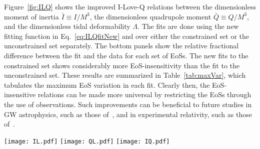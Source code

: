 \documentclass[prd,twocolumn,nofootinbib,superscriptaddress,amsmath,amssymb]{revtex4-1}
\begin{document}
Figure~\ref{fig:ILQ} shows the improved I-Love-Q relations between the dimensionless moment of inertia $\bar{I} \equiv I/M^3$, the dimensionless quadrupole moment $\bar{Q} \equiv Q/M^3$, and the dimensionless tidal deformability $\Lambda$. The fits are done using the new fitting function in Eq.~\eqref{eq:ILQfitNew} and over either the constrained set or the unconstrained set separately. The bottom panels show the relative fractional difference between the fit and the data for each set of EoSs. The new fits to the constrained set shows considerably more EoS-insensitivity than the fit to the unconstrained set. These results are summarized in Table~\ref{tab:maxVar}, which tabulates the maximum EoS variation in each fit. Clearly then, the EoS-insensitive relations can be made more universal by restricting the EoSs through the use of observations. Such improvements can be beneficial to future studies in GW astrophysics, such as those of~\cite{Kumar:2019xgp}, and in experimental relativity, such as those of~\cite{Gupta:2017vsl}. 

\begin{figure*}[htb]
\begin{center} 
\texttt{[image: IL.pdf]}
\texttt{[image: QL.pdf]}
\texttt{[image: IQ.pdf]}
\end{center}
\caption{
Individual I-Love-Q relations $\bar{I}-\Lambda$ (left), $\bar{Q}-\Lambda$ (center), and $\bar{I}-\bar{Q}$ (right), shown for both the constrained EoSs (solid green) and unconstrained EoSs (dotted maroon).
In these figures, the black dashed lines correspond to the fits given by Eq.~\eqref{eq:ILQfitNew}.
The fractional difference from the fits, shown in the bottom panels, is greatly suppressed for the constrained case, compared to both the unconstrained case, and results from previous works~\cite{Yagi:2013bca,Yagi:ILQ}.
The maximal EoS variation from the fits for the unconstrained and constrained sets of EoSs are compared in Table~\ref{tab:maxVar}.
Additionally shown in this figure is the fractional difference from the nuclear matter fits for the 10 hybrid star EoSs (dashed green).
}
\label{fig:ILQ}
\end{figure*} 
\end{document}
